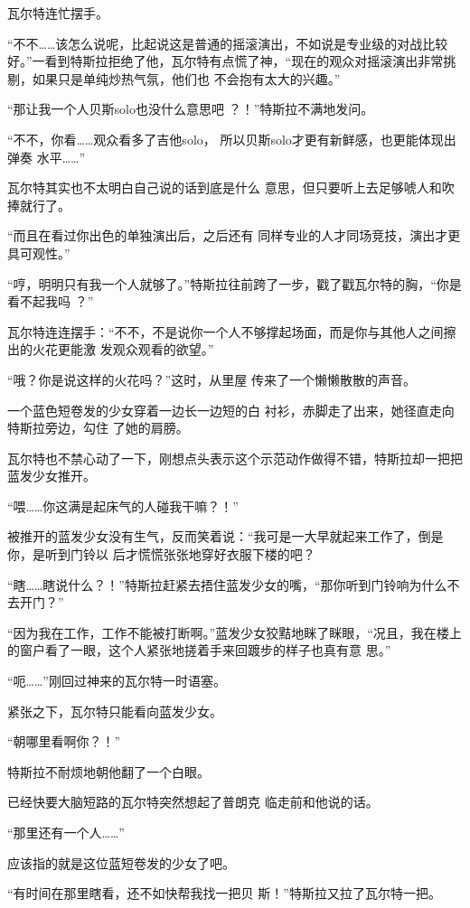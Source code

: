 \documentclass{article}
\begin{document}
瓦尔特连忙摆手。 

“不不……该怎么说呢，比起说这是普通的摇滚演出，不如说是专业级的对战比较好。”一看到特斯拉拒绝了他，瓦尔特有点慌了神，“现在的观众对摇滚演出非常挑剔，如果只是单纯炒热气氛，他们也
不会抱有太大的兴趣。” 

“那让我一个人贝斯solo也没什么意思吧
？！”特斯拉不满地发问。 

“不不，你看……观众看多了吉他solo，
\newpage
所以贝斯solo才更有新鲜感，也更能体现出弹奏
水平……” 

瓦尔特其实也不太明白自己说的话到底是什么
意思，但只要听上去足够唬人和吹捧就行了。 

“而且在看过你出色的单独演出后，之后还有
同样专业的人才同场竞技，演出才更具可观性。” 

“哼，明明只有我一个人就够了。”特斯拉往前跨了一步，戳了戳瓦尔特的胸，“你是看不起我吗
？” 

瓦尔特连连摆手：“不不，不是说你一个人不够撑起场面，而是你与其他人之间擦出的火花更能激
发观众观看的欲望。” 

“哦？你是说这样的火花吗？”这时，从里屋
传来了一个懒懒散散的声音。 

一个蓝色短卷发的少女穿着一边长一边短的白
\newpage
衬衫，赤脚走了出来，她径直走向特斯拉旁边，勾住
了她的肩膀。 

瓦尔特也不禁心动了一下，刚想点头表示这个示范动作做得不错，特斯拉却一把把蓝发少女推开。

“喂……你这满是起床气的人碰我干嘛？！”

被推开的蓝发少女没有生气，反而笑着说：“我可是一大早就起来工作了，倒是你，是听到门铃以
后才慌慌张张地穿好衣服下楼的吧？ 

“瞎……瞎说什么？！”特斯拉赶紧去捂住蓝发少女的嘴，“那你听到门铃响为什么不去开门？”

“因为我在工作，工作不能被打断啊。”蓝发少女狡黠地眯了眯眼，“况且，我在楼上的窗户看了一眼，这个人紧张地搓着手来回踱步的样子也真有意
思。” 


\newpage

“呃……”刚回过神来的瓦尔特一时语塞。 


紧张之下，瓦尔特只能看向蓝发少女。 


“朝哪里看啊你？！” 


特斯拉不耐烦地朝他翻了一个白眼。 

已经快要大脑短路的瓦尔特突然想起了普朗克
临走前和他说的话。 


“那里还有一个人……” 


应该指的就是这位蓝短卷发的少女了吧。 

“有时间在那里瞎看，还不如快帮我找一把贝
斯！”特斯拉又拉了瓦尔特一把。 
\end{document}
